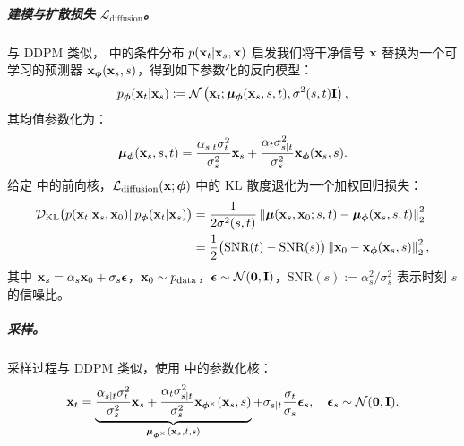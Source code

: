 \subparagraph{建模与扩散损失 $\mathcal{L}_{\text{diffusion}}$。}
与 DDPM 类似， 中的条件分布 $p({\mathbf{x}}_t|{\mathbf{x}}_s, {\mathbf{x}})$ 启发我们将干净信号 ${\mathbf{x}}$ 替换为一个可学习的预测器 ${\mathbf{x}}_{\bm{\phi}}({\mathbf{x}}_s, s)$，得到如下参数化的反向模型：
\begin{align}\label{eq:general-ddpm-sampling}
    p_{\bm{\phi}}({\mathbf{x}}_t | {\mathbf{x}}_s) := \mathcal{N}\left({\mathbf{x}}_t; \bm{\mu}_{\bm{\phi}}({\mathbf{x}}_s, s, t), \sigma^2(s,t) \mathbf{I}\right),
\end{align}
其均值参数化为：
\[
    \bm{\mu}_{\bm{\phi}}({\mathbf{x}}_s, s, t) = \frac{\alpha_{s|t} \sigma_t^2}{\sigma_s^2} {\mathbf{x}}_s + \frac{\alpha_t \sigma_{s|t}^2}{\sigma_s^2} {\mathbf{x}}_{\bm{\phi}}({\mathbf{x}}_s, s).
\]
给定  中的前向核，$\mathcal{L}_{\text{diffusion}}({\mathbf{x}}; \bm{\phi})$ 中的 KL 散度退化为一个加权回归损失：
\begin{align}
\begin{aligned}
    \label{eq:snr-kl}
    \mathcal{D}_{\text{KL}}\big(p({\mathbf{x}}_t|{\mathbf{x}}_s, {\mathbf{x}}_0)  \| p_{\bm{\phi}}({\mathbf{x}}_t|{\mathbf{x}}_s)\big)  
    &= \frac{1}{2\sigma^2(s,t)} \left\| \bm{\mu}({\mathbf{x}}_s, {\mathbf{x}}_0; s,t) - \bm{\mu}_{\bm{\phi}}({\mathbf{x}}_s, s, t) \right\|_2^2 \\
    &= \frac{1}{2} \big(\text{SNR}(t) - \text{SNR}(s)\big) \left\| {\mathbf{x}}_0 - {\mathbf{x}}_{\bm{\phi}}({\mathbf{x}}_s, s) \right\|_2^2,
\end{aligned}
\end{align}
其中 ${\mathbf{x}}_s = \alpha_s{\mathbf{x}}_0 + \sigma_s\bm{\epsilon}$，${\mathbf{x}}_0 \sim p_{\mathrm{data}}$，$\bm{\epsilon} \sim \mathcal{N}(\bm{0}, {\mathbf{I}})$，$\text{SNR}(s) := \alpha_s^2 / \sigma_s^2$ 表示时刻 $s$ 的信噪比。



\subparagraph{采样。}
采样过程与 DDPM 类似，使用  中的参数化核：
\begin{align}\label{eq:general-ddpm-sampling-discrete}
    {\mathbf{x}}_t = \underbrace{\frac{\alpha_{s|t} \sigma_t^2}{\sigma_s^2} {\mathbf{x}}_s + \frac{\alpha_t \sigma_{s|t}^2}{\sigma_s^2} {\mathbf{x}}_{\bm{\phi}^\times}({\mathbf{x}}_s, s)}_{\bm{\mu}_{\bm{\phi}^\times}({\mathbf{x}}_s, t, s)} + \sigma_{s|t} \frac{\sigma_t}{\sigma_s} \bm{\epsilon}_s,\quad  \bm{\epsilon}_s \sim \mathcal{N}(\bm{0}, {\mathbf{I}}).
\end{align}



